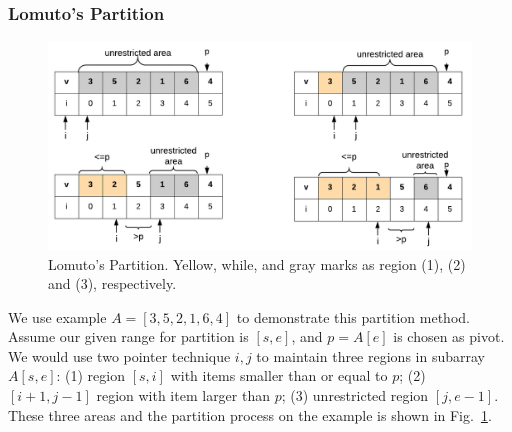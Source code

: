 \documentclass[../main.tex]{subfiles}
\begin{document}




\subsubsection{Lomuto's Partition}
\begin{figure}[!ht]
    \centering

    \includegraphics[width=0.98\columnwidth]{fig/quicksort.png}
    \caption{Lomuto's Partition. Yellow, while, and gray marks as region (1), (2) and (3), respectively.}
        \label{fig:lumo_partition}
\end{figure}
We use example $A=[3, 5, 2, 1, 6, 4]$ to demonstrate this partition method. Assume our given range for partition is $[s, e]$, and  $p = A[e]$ is chosen as pivot. We would use two pointer technique $i, j$ to maintain three regions in subarray $A[s, e]$: (1) region $[s, i]$ with items smaller than or equal to $p$;  (2) $[i+1, j-1]$ region with item larger than $p$; (3) unrestricted region $[j, e-1]$.  These three areas and the partition process on the example is shown in Fig.~\ref{fig:lumo_partition}. 
\end{document}
